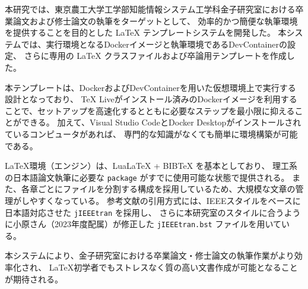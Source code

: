 \documentclass[main]{subfiles}
\begin{document}
本研究では、東京農工大学工学部知能情報システム工学科金子研究室における卒業論文および修士論文の執筆をターゲットとして、
効率的かつ簡便な執筆環境を提供することを目的とした {\LaTeX} テンプレートシステムを開発した。
本システムでは、実行環境となるDockerイメージと執筆環境であるDevContainerの設定、
さらに専用の {\LaTeX} クラスファイルおよび卒論用テンプレートを作成した。

本テンプレートは、DockerおよびDevContainerを用いた仮想環境上で実行する設計となっており、
{\TeX} Liveがインストール済みのDockerイメージを利用することで、セットアップを高速化するとともに必要なステップを最小限に抑えることができる。
加えて、Visual Studio CodeとDocker Desktopがインストールされているコンピュータがあれば、
専門的な知識がなくても簡単に環境構築が可能である。

{\LaTeX}環境（エンジン）は、Lua{\LaTeX} + B{\small{IB}}{\TeX} を基本としており、
理工系の日本語論文執筆に必要な \texttt{package} がすでに使用可能な状態で提供される。
また、各章ごとにファイルを分割する構成を採用しているため、大規模な文章の管理がしやすくなっている。
参考文献の引用方式には、IEEEスタイルをベースに日本語対応させた \texttt{jIEEEtran} を採用し、
さらに本研究室のスタイルに合うように小原さん（2023年度配属）が修正した \texttt{jIEEEtran.bst} ファイルを用いている。

本システムにより、金子研究室における卒業論文・修士論文の執筆作業がより効率化され、
{\LaTeX}初学者でもストレスなく質の高い文書作成が可能となることが期待される。
\end{document}
